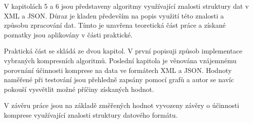V kapitolách 5 a 6 jsou představeny algoritmy využívající znalosti struktury dat v XML a JSON. Důraz je kladen především na popis využití této znalosti a způsobu zpracování dat. Tímto je uzavřena teoretická část práce a získané poznatky jsou aplikovány v části praktické.

Praktická část se skládá ze dvou kapitol. V první popisuji způsob implementace vybraných kompresních algoritmů. Poslední kapitola je věnována vzájemnému porovnání účinnosti komprese na data ve formátech XML a JSON. Hodnoty naměřené při testování jsou přehledně zapsány pomocí grafů a autor se navíc pokouší vysvětlit možné příčiny získaných hodnot.

V závěru práce jsou na základě změřených hodnot vyvozeny závěry o účinnosti komprese využívající znalosti struktury datového formátu.
